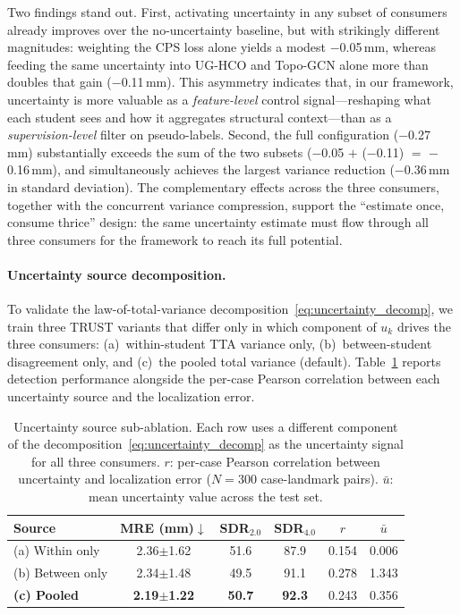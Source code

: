 \documentclass[conference]{IEEEtran}
\begin{document}
Two findings stand out. First, activating uncertainty in any subset of consumers already improves over the no-uncertainty baseline, but with strikingly different magnitudes: weighting the CPS loss alone yields a modest $-$0.05\,mm, whereas feeding the same uncertainty into UG-HCO and Topo-GCN alone more than doubles that gain ($-$0.11\,mm). This asymmetry indicates that, in our framework, uncertainty is more valuable as a \emph{feature-level} control signal---reshaping what each student sees and how it aggregates structural context---than as a \emph{supervision-level} filter on pseudo-labels. Second, the full configuration ($-$0.27\,mm) substantially exceeds the sum of the two subsets ($-$0.05 $+$ ($-$0.11) $=$ $-$0.16\,mm), and simultaneously achieves the largest variance reduction ($-$0.36\,mm in standard deviation). The complementary effects across the three consumers, together with the concurrent variance compression, support the ``estimate once, consume thrice'' design: the same uncertainty estimate must flow through all three consumers for the framework to reach its full potential.

\paragraph{Uncertainty source decomposition.}
To validate the law-of-total-variance decomposition~\eqref{eq:uncertainty_decomp}, we train three TRUST variants that differ only in which component of $u_k$ drives the three consumers: (a)~within-student TTA variance only, (b)~between-student disagreement only, and (c)~the pooled total variance (default). Table~\ref{tab:unc_source} reports detection performance alongside the per-case Pearson correlation between each uncertainty source and the localization error.

\begin{table}[t]
\centering
\caption{Uncertainty source sub-ablation. Each row uses a different component of the decomposition~\eqref{eq:uncertainty_decomp} as the uncertainty signal for all three consumers. $r$: per-case Pearson correlation between uncertainty and localization error ($N = 300$ case-landmark pairs). $\bar{u}$: mean uncertainty value across the test set.}
\label{tab:unc_source}
\setlength{\tabcolsep}{3pt}
\footnotesize
\begin{tabular}{l c c c c c}
\toprule
Source & MRE (mm)$\downarrow$ & \scriptsize SDR$_{2.0}$ & \scriptsize SDR$_{4.0}$ & $r$ & $\bar{u}$ \\
\midrule
(a) Within only      & 2.36$\pm$1.62 & 51.6 & 87.9 & 0.154 & 0.006 \\
(b) Between only     & 2.34$\pm$1.48 & 49.5 & 91.1 & 0.278 & 1.343 \\
\midrule
\textbf{(c) Pooled}  & \textbf{2.19$\pm$1.22} & \textbf{50.7} & \textbf{92.3} & 0.243 & 0.356 \\
\bottomrule
\end{tabular}
\end{table}
\end{document}
